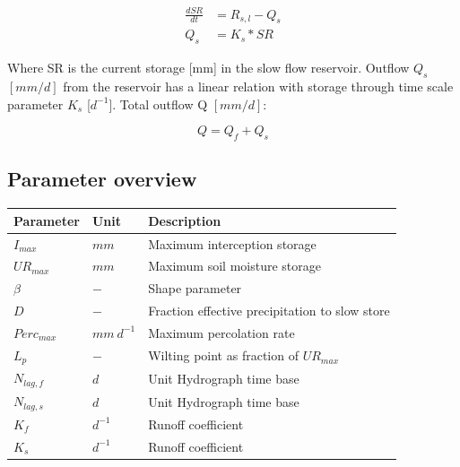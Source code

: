 \begin{align}
	\frac{dSR}{dt} &= R_{s,l} - Q_s \\
	Q_s &= K_s * SR 
\end{align}

Where SR is the current storage [mm] in the slow flow reservoir. Outflow $Q_s$ $[mm/d]$ from the reservoir has a linear relation with storage through time scale parameter $K_s$ [$d^{-1}$]. Total outflow Q  $[mm/d]$:

\begin{equation}
	Q = Q_f + Q_s
\end{equation}

\subsection{Parameter overview}
\begin{table}[htbp]
  \centering
    \begin{tabular}{lll}
    \toprule
    Parameter & Unit  & Description \\
    \midrule
    $I_{max}$ & $mm$  & Maximum interception storage \\
    $UR_{max}$ & $mm$  & Maximum soil moisture storage \\
    $\beta$ & $-$   & Shape parameter \\
    $D$   & $-$   & Fraction effective precipitation to slow store \\
    $Perc_{max}$ & $mm~d^{-1}$ & Maximum percolation rate \\
    $L_p$ & $-$   & Wilting point as fraction of $UR_{max}$ \\
    $N_{lag,f}$ & $d$   & Unit Hydrograph time base \\
    $N_{lag,s}$ & $d$   & Unit Hydrograph time base \\
    $K_f$ & $d^{-1}$ & Runoff coefficient \\
    $K_s$ & $d^{-1}$ & Runoff coefficient \\
    \bottomrule
    \end{tabular}%
  \label{tab:addlabel}%
\end{table}%
